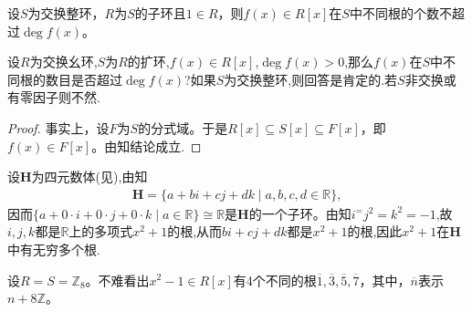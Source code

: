 \documentclass[../../main.tex]{subfiles}%
\begin{document}
\begin{proposition}\label{proposition:一元多项式的根不超过其次数}
设$S$为交换整环，$R$为$S$的子环且$1\in R$，则$f(x)\in R[x]$在$S$中不同根的个数不超过$\deg f(x)$。
\end{proposition}
\begin{remark}
设$R$为交换幺环,$S$为$R$的扩环,$f(x)\in R[x]$,$\deg f(x) > 0$,那么$f(x)$在$S$中不同根的数目是否超过$\deg f(x)$?如果$S$为交换整环,则回答是肯定的.若$S$非交换或有零因子则不然.
\end{remark}
\begin{proof}

事实上，设$F$为$S$的分式域。于是$R[x]\subseteq S[x]\subseteq F[x]$，即$f(x)\in F[x]$。由知结论成立.

\end{proof}

\begin{example}
设$\mathbf{H}$为四元数体(见),由知
\begin{align*}
\mathbf{H}=\{a+bi+cj+dk\mid a,b,c,d\in\mathbb{R}\},
\end{align*}
因而$\{a+0\cdot i+0\cdot j+0\cdot k\mid a\in\mathbb{R}\}\cong\mathbb{R}$是$\mathbf{H}$的一个子环。由知$i^=j^2=k^2=-1$,故$i,j,k$都是$\mathbb{R}$上的多项式$x^2+1$的根,从而$bi+cj+dk$都是$x^2+1$的根,因此$x^2+1$在$\mathbf{H}$中有无穷多个根.
\end{example}

\begin{example}
设$R=S=\mathbb{Z}_8$。不难看出$x^2-1\in R[x]$有4个不同的根$\overline{1},\overline{3},\overline{5},\overline{7}$，其中，$\overline{n}$表示$n+8\mathbb{Z}$。
\end{example}
\end{document}
